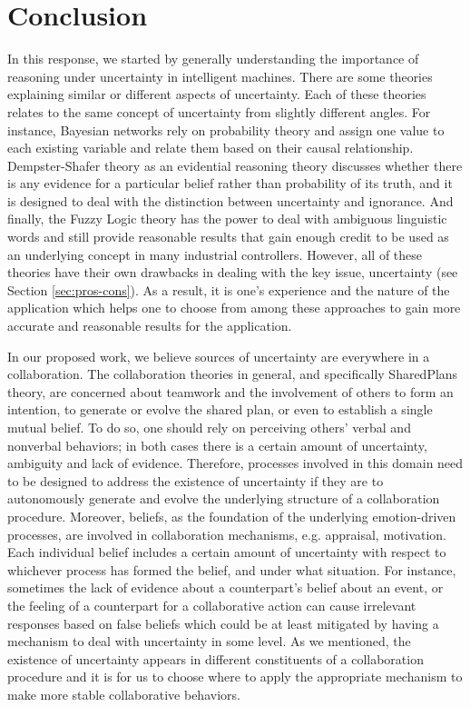 \documentclass[11pt]{article}
\begin{document}
\section{Conclusion}
\label{sec:conclusion}

In this response, we started by generally understanding the importance of
reasoning under uncertainty in intelligent machines. There are some theories
explaining similar or different aspects of uncertainty. Each of these theories
relates to the same concept of uncertainty from slightly different angles. For
instance, Bayesian networks rely on probability theory and assign one value
to each existing variable and relate them based on their causal relationship.
Dempster-Shafer theory as an evidential reasoning theory discusses whether there
is any evidence for a particular belief rather than probability of its truth,
and it is designed to deal with the distinction between uncertainty and ignorance.
And finally, the Fuzzy Logic theory has the power to deal with ambiguous
linguistic words and still provide reasonable results that gain enough credit
to be used as an underlying concept in many industrial controllers. However, all
of these theories have their own drawbacks in dealing with the key issue,
uncertainty (see Section \ref{sec:pros-cons}). As a result, it is one's
experience and the nature of the application which helps one to choose from
among these approaches to gain more accurate and reasonable results for the
application.

In our proposed work, we believe sources of uncertainty are everywhere in a
collaboration. The collaboration theories in general, and specifically
SharedPlans theory, are concerned about teamwork and the involvement of others
to form an intention, to generate or evolve the shared plan, or even to establish a
single mutual belief. To do so, one should rely on perceiving others' verbal and
nonverbal behaviors; in both cases there is a certain amount of uncertainty,
ambiguity and lack of evidence. Therefore, processes involved in this domain
need to be designed to address the existence of uncertainty if they are to 
autonomously generate and evolve the underlying structure of a collaboration
procedure. Moreover, beliefs, as the foundation of the underlying emotion-driven
processes, are involved in collaboration mechanisms, e.g. appraisal,
motivation.
Each individual belief includes a certain amount of uncertainty with respect to
whichever process has formed the belief, and under what situation. For instance,
sometimes the lack of evidence about a counterpart's belief about an event, or
the feeling of a counterpart for a collaborative action can cause irrelevant
responses based on false beliefs which could be at least mitigated by having a
mechanism to deal with uncertainty in some level. As we mentioned, the existence
of uncertainty appears in different constituents of a collaboration procedure
and it is for us to choose where to apply the appropriate mechanism to make more
stable collaborative behaviors.



\end{document}
